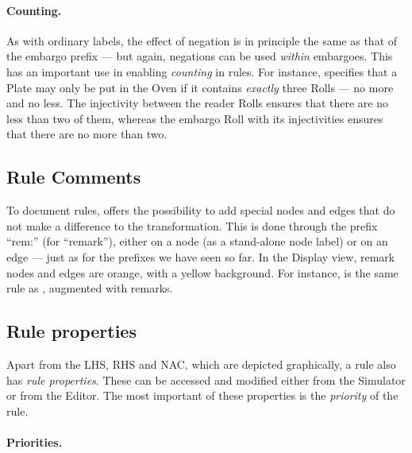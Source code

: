 
\paragraph{Counting.}

As with ordinary labels, the effect of negation is in principle the same as
that of the embargo prefix --- but again, negations can be used \emph{within}
embargoes. This has an important use in enabling \emph{counting} in rules. For
instance,  specifies that a \textsf{Plate} may only be put in
the \textsf{Oven} if it contains \emph{exactly} three \textsf{Roll}s --- no
more and no less. The injectivity between the reader \textsf{Roll}s ensures
that there are no less than two of them, whereas the embargo \textsf{Roll} with
its injectivities ensures that there are no more than two.


\subsection{Rule Comments}

To document rules, \Groove{} offers the possibility to add special nodes and
edges that do not make a difference to the transformation. This is done through
the prefix ``\textsf{rem:}'' (for ``remark''), either on a node (as a
stand-alone node label) or on an edge --- just as for the prefixes we have seen
so far. In the Display view, remark nodes and edges are orange, with a yellow
background. For instance,  is the same rule as ,
augmented with remarks.


\subsection{Rule properties}

Apart from the LHS, RHS and NAC, which are depicted graphically, a rule also
has \emph{rule properties}. These can be accessed and modified either from the
Simulator or from the Editor. The most important of these properties is the
\emph{priority} of the rule. 

\paragraph{Priorities.}

